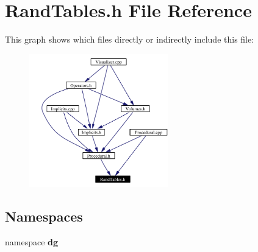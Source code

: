\section{Rand\-Tables.h File Reference}
\label{RandTables_8h}


This graph shows which files directly or indirectly include this file:\begin{figure}[H]
\begin{center}
\leavevmode
\includegraphics[width=170pt]{RandTables_8h__dep__incl}
\end{center}
\end{figure}
\subsection*{Namespaces}
\begin{CompactItemize}
\item 
namespace {\bf dg}
\end{CompactItemize}
